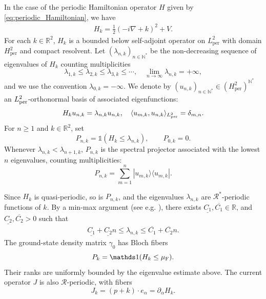 \documentclass[a4paper,11pt]{article}
\newcommand{\per}{\mathrm{per}}
\theoremstyle{plain}
\theoremstyle{remark}
\def\R{{\mathbb R}}
\def\N{{\mathbb N}}
\def\cR{{\mathcal R}}
\begin{document}
\medskip


In the case of the periodic Hamiltonian operator $H$ given by \eqref{eq:periodic_Hamiltonian}, we have
  \begin{align} \label{eq:Hk}
    H_k = \frac 1 2 (-i\nabla+k)^2 + V.
  \end{align}
  For each $k \in \R^2$, $H_k$ is a bounded below self-adjoint operator on $L^{2}_{\per}$ with domain $H_{\per}^{2}$ and compact resolvent.
  Let $(\lambda_{n,k})_{n \in \N^\ast}$ be the non-decreasing sequence of eigenvalues of $H_k$ counting multiplicities
  $$
  \lambda_{1,k}\leq \lambda_{2,k}\leq \lambda_{3,k} \leq \cdots , \quad \lim_{n \to \infty} \lambda_{n,k}=+\infty,
  $$
  and we use the convention $\lambda_{0,k} = -\infty$. We denote by
  $(u_{n,k})_{n \in \N^\ast} \in (H_{\per}^{2})^{\mathbb N^{*}}$ an $L^2_{\rm per}$-orthonormal basis of associated eigenfunctions:
  \begin{align*}
    H_k u_{n,k} = \lambda_{n,k} u_{n,k}, \quad \langle u_{m,k},u_{n,k}\rangle_{L^2_{\rm per}}=\delta_{m,n}.
  \end{align*}
For $n\ge1$ and $k\in\R^2$, set
\[
P_{n,k}=\mathds 1(H_k\le\lambda_{n,k}),\qquad P_{0,k}=0.
\]
Whenever $\lambda_{n,k}<\lambda_{n+1,k}$, $P_{n,k}$ is the spectral
projector associated with the lowest $n$ eigenvalues, counting multiplicities:
\begin{equation}\label{eq:def_PNk}
P_{n,k}=\sum_{m=1}^n|u_{m,k}\rangle\langle u_{m,k}|.
\end{equation}

  Since $H_k$ is quasi-periodic, so is $P_{n,k}$, and the eigenvalues $\lambda_{n,k}$ are
  ${\mathcal R}^\ast$-periodic functions of $k$. By a min-max argument
  (see e.g. \cite{ReedSimon4}), there exists
  $\underline{C_1}, \overline{C_1} \in \R$, and
  $\underline{C_2},\overline{C_2}>0$ such that
  \begin{align}
    \label{eq:asymptotics_eigenvalues}
 \underline{C_1}+ \underline{C_2} n  \leq \lambda_{n,k} \leq  \overline{C_1}+ \overline{C_2} n.
\end{align}
The ground-state density matrix $\gamma_0$ has Bloch fibers
\begin{equation}\label{eq:gk0}
P_k=\mathds 1(H_k\le\mu_{\rm F}).
\end{equation}
Their ranks are uniformly bounded by the eigenvalue estimate above.
The current operator $J$ is also $\cR$-periodic, with fibers
\[
J_k=(p+k)\cdot e_\alpha=\partial_\alpha H_k.
\]
\end{document}
